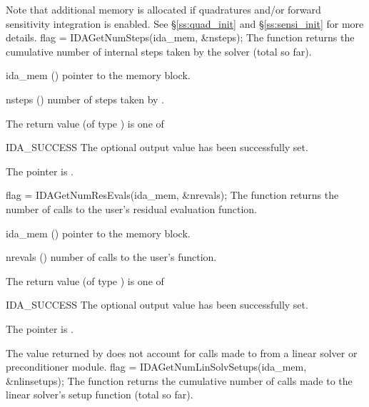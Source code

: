 {{  Note that additional memory is allocated if quadratures and/or forward sensitivity
  integration is enabled. See \S\ref{ss:quad_init} and \S\ref{ss:sensi_init}
  for more details.
}
{
  flag = IDAGetNumSteps(ida\_mem, \&nsteps);
}
{
  The function  returns the cumulative number of internal
  steps taken by the solver (total so far).
}
{
  \begin{args}
  \item[ida\_mem] ()
    pointer to the {\idas} memory block.
  \item[nsteps] ()
    number of steps taken by {\idas}.
  \end{args}
}
{
  The return value  (of type ) is one of
  \begin{args}
  \item[IDA\_SUCCESS]
    The optional output value has been successfully set.
  \item[\Id{IDA\_MEM\_NULL}]
    The  pointer is .
  \end{args}
}
{}
{
  flag = IDAGetNumResEvals(ida\_mem, \&nrevals);
}
{
  The function  returns the
  number of calls to the user's residual evaluation function.
}
{
  \begin{args}
  \item[ida\_mem] ()
    pointer to the {\idas} memory block.
  \item[nrevals] ()
    number of calls to the user's  function.
  \end{args}
}
{
  The return value  (of type ) is one of
  \begin{args}
  \item[IDA\_SUCCESS]
    The optional output value has been successfully set.
  \item[\Id{IDA\_MEM\_NULL}]
    The  pointer is .
  \end{args}
}
{
  The  value returned by  does not
  account for calls made to  from a linear solver or preconditioner
  module.
}
{
  flag = IDAGetNumLinSolvSetups(ida\_mem, \&nlinsetups);
}
{
  The function  returns the
  cumulative number of calls made to the linear solver's setup function
  (total so far).
}
{
  \begin{args}[nlinsetups]

\end{args}}}
